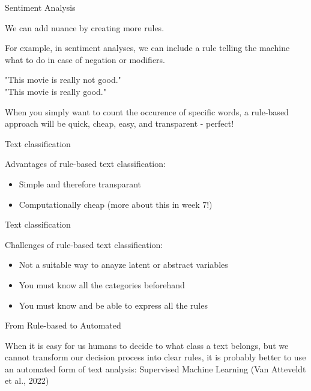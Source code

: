 \documentclass[compress]{beamer}
\begin{document}
\begin{frame}[fragile]{Sentiment Analysis}

We can add nuance by creating more rules.

\pause

For example, in sentiment analyses, we can include a rule telling the machine what to do in case of negation or modifiers.

"This movie is really not good." \\
"This movie is really good." 

\pause

When you simply want to count the occurence of specific words, a rule-based approach will be quick, cheap, easy, and transparent - perfect!

\end{frame}


\begin{frame}[fragile]{Text classification}
	
\begin{alertblock}{Advantages of rule-based text classification:}
	\begin{itemize}
		\item Simple and therefore transparant
		\item Computationally cheap (more about this in week 7!)
	\end{itemize}

\end{alertblock}
\end{frame}


\begin{frame}[fragile]{Text classification}
	
\begin{alertblock}{Challenges of rule-based text classification:}
	\begin{itemize}
	\item Not a suitable way to anayze latent or abstract variables 
	\pause
	\item You must know all the categories beforehand
	\pause
	\item You must know and be able to express all the rules
	\end{itemize}

\end{alertblock}
\end{frame}


\begin{frame}{From Rule-based to Automated}
	
When it is easy for us humans to decide to what class a text belongs, but we cannot transform our decision process into clear rules, it is probably better to use an automated form of text analysis: Supervised Machine Learning (Van Atteveldt et al., 2022)
	
\end{frame}
\end{document}

